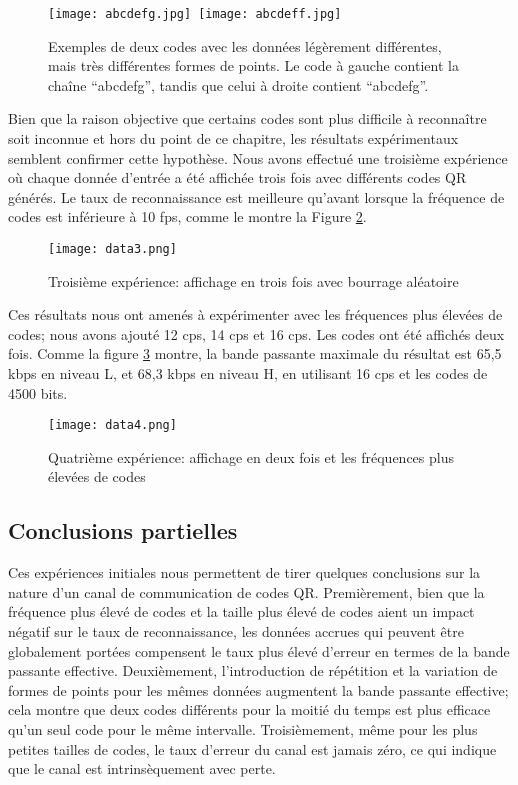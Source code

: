 \begin{figure}
\centering
\texttt{[image: abcdefg.jpg]}~\texttt{[image: abcdeff.jpg]}
\caption{Exemples de deux codes avec les données légèrement différentes, mais très différentes formes de points. Le code à gauche contient la chaîne ``abcdefg'', tandis que celui à droite contient ``abcdefg''.}
\label{fig:qr:difcodes}
\end{figure}

Bien que la raison objective que certains codes sont plus difficile à reconnaître soit inconnue et hors du point de ce chapitre, les résultats expérimentaux semblent confirmer cette hypothèse. Nous avons effectué une troisième expérience où chaque donnée d'entrée a été affichée trois fois avec différents codes QR générés. Le taux de reconnaissance est meilleure qu'avant lorsque la fréquence de codes est inférieure à 10 fps, comme le montre la Figure \ref{img-exp3}.

\begin{figure}[ht]
\begin{center}
\centering
\texttt{[image: data3.png]}
\caption{Troisième expérience: affichage en trois fois avec bourrage aléatoire}
\label{img-exp3}
\end{center}
\end{figure}

Ces résultats nous ont amenés à expérimenter avec les fréquences plus élevées de codes; nous avons ajouté 12 cps, 14 cps et 16 cps. Les codes ont été affichés deux fois. Comme la figure \ref{img-exp4} montre, la bande passante maximale du résultat est 65,5 kbps en niveau L, et 68,3 kbps en niveau H, en utilisant 16 cps et les codes de 4500 bits.

\begin{figure}[ht]
\begin{center}
\centering
\texttt{[image: data4.png]}
\caption{Quatrième expérience: affichage en deux fois et les fréquences plus élevées de codes}
\label{img-exp4}
\end{center}
\end{figure}

\subsection{Conclusions partielles}

Ces expériences initiales nous permettent de tirer quelques conclusions sur la nature d'un canal de communication de codes QR. Premièrement, bien que la fréquence plus élevé de codes et la taille plus élevé de codes aient un impact négatif sur le taux de reconnaissance, les données accrues qui peuvent être globalement portées compensent le taux plus élevé d'erreur en termes de la bande passante effective. Deuxièmement, l'introduction de répétition et la variation de formes de points pour les mêmes données augmentent la bande passante effective; cela montre que deux codes différents pour la moitié du temps est plus efficace qu'un seul code pour le même intervalle. Troisièmement, même pour les plus petites tailles de codes, le taux d'erreur du canal est jamais zéro, ce qui indique que le canal est intrinsèquement avec perte.

